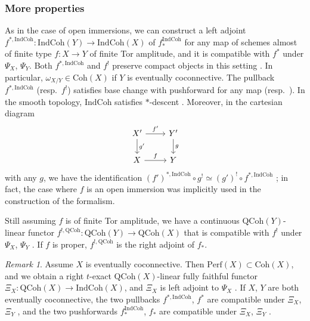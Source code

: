 \documentclass{amsart}
\theoremstyle{definition}
\theoremstyle{remark}
\newtheorem{remark}[theorem]{Remark}
\numberwithin{equation}{section}
\newcommand{\IndCoh}{\mathrm{IndCoh}}
\newcommand{\QCoh}{\mathrm{QCoh}}
\newcommand{\Coh}{\mathrm{Coh}}
\newcommand{\Perf}{\mathrm{Perf}}
\begin{document}
\subsubsection{More properties}{\label{sss: moreproperties}}
As in the case of open immersions, we can construct a left adjoint $f^{*, \IndCoh}\colon \IndCoh(Y)\to \IndCoh(X)$ of $f_*^{\IndCoh}$ for any map of schemes almost of finite type $f\colon X\to Y$ of finite Tor amplitude, and it is compatible with $f^*$ under $\Psi_X$, $\Psi_Y$. Both $f^{*, \IndCoh}$ and $f^!$ preserve compact objects in this setting \cite[Lemma 7.1.2]{GaitsgoryIndCohSheaves}. In particular, $\omega_{X/Y}\in \Coh (X)$ if $Y$ is eventually coconnective. The pullback $f^{*, \IndCoh}$ (resp.~$f^!$) satisfies base change with pushforward for any map \cite[Proposition 4.3.2.2]{GRI} (resp.~\cite[Proposition 7.1.6]{GaitsgoryIndCohSheaves}). In the smooth topology, $\IndCoh$ satisfies $*$-descent \cite[Proposition 8.3.8]{GaitsgoryIndCohSheaves}. Moreover, in the cartesian diagram
\[
\begin{tikzcd}
X' \arrow[r, "f'"] \arrow[d, "g'"] & Y' \arrow[d, "g"] \\
X \arrow[r, "f"] & Y
\end{tikzcd}
\]
with any $g$, we have the identification $(f')^{*, \IndCoh}\circ g^!\simeq (g')^{!}\circ f^{*, \IndCoh}$ \cite[Proposition 7.1.6]{GaitsgoryIndCohSheaves}; in fact, the case where $f$ is an open immersion was implicitly used in the construction of the formalism. 

Still assuming $f$ is of finite Tor amplitude, we have a continuous $\QCoh(Y)$-linear functor $f^{!,\QCoh}\colon \QCoh(Y)\to \QCoh(X)$ that is compatible with $f^!$ under $\Psi_X$, $\Psi_Y$ \cite[Proposition 7.2.2]{GaitsgoryIndCohSheaves}. If $f$ is proper, $f^{!, \QCoh}$ is the right adjoint of $f_*$.  

\begin{remark}    
Assume $X$ is eventually coconnective. Then $\Perf(X)\subset \Coh(X)$, and we obtain a right $t$-exact $\QCoh(X)$-linear fully faithful functor $\Xi_X\colon \QCoh(X)\to \IndCoh(X)$, and $\Xi_X$ is left adjoint to $\Psi_X$ \cite[\S 1.5]{GaitsgoryIndCohSheaves}. If $X$, $Y$ are both eventually coconnective, the two pullbacks $f^{*, \IndCoh}$, $f^{*}$ are compatible under $\Xi_X$, $\Xi_Y$ \cite[Lemma 3.5.11]{GaitsgoryIndCohSheaves}, and the two pushforwards $f_*^{ \IndCoh}$, $f_*$ are compatible under $\Xi_X$, $\Xi_Y$ \cite[Proposition 3.6.7]{GaitsgoryIndCohSheaves}. 
\end{remark}
\end{document}
